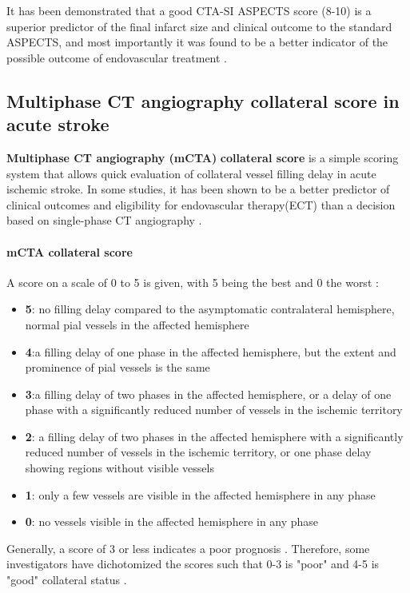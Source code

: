 It has been demonstrated that a good CTA-SI ASPECTS score (8-10) is a superior predictor of the final infarct size and clinical outcome to the standard ASPECTS, and most importantly it was found to be a better indicator of the possible outcome of endovascular treatment .

\subsection{Multiphase CT angiography collateral score in acute stroke}

\textbf{Multiphase CT angiography (mCTA)} \textbf{collateral score} is a simple scoring system that allows quick evaluation of collateral vessel filling delay in acute ischemic stroke. In some studies, it has been shown to be a better predictor of clinical outcomes and eligibility for endovascular therapy(ECT) than a decision based on single-phase CT angiography .

\paragraph{mCTA collateral score}

A score on a scale of 0 to 5 is given, with 5 being the best and 0 the worst :

\begin{itemize}
	\tightlist
	\item
	\textbf{5}: no filling delay compared to the asymptomatic contralateral hemisphere, normal pial vessels in the affected hemisphere
	\item
	\textbf{4}:a filling delay of one phase in the affected hemisphere, but the extent and prominence of pial vessels is the same
	\item
	\textbf{3}:a filling delay of two phases in the affected hemisphere, or a delay of one phase with a significantly reduced number of vessels in the ischemic territory
	\item
	\textbf{2}: a filling delay of two phases in the affected hemisphere with a significantly reduced number of vessels in the ischemic territory, or one phase delay showing regions without visible vessels
	\item
	\textbf{1}: only a few vessels are visible in the affected hemisphere in any phase
	\item
	\textbf{0}: no vessels visible in the affected hemisphere in any phase
\end{itemize}

Generally, a score of 3 or less indicates a poor prognosis . Therefore, some investigators have dichotomized the scores such that 0-3 is "poor" and 4-5 is "good" collateral status .

